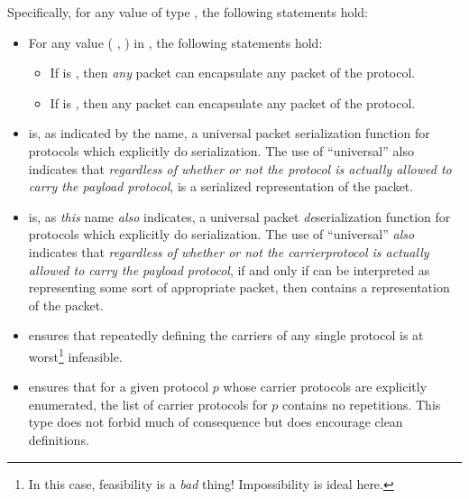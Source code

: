 \documentclass{report}
\begin{document}
Specifically, for any value  of type  , the following statements hold:
\begin{itemize}
	\item For any value \AgdaSymbol( \AgdaSymbol , \AgdaSymbol) in  , the following statements hold:
	\begin{itemize}
		\item If  is , then \emph{any} packet can encapsulate any packet of the  protocol.
		\item If  is  , then any  packet can encapsulate any packet of the  protocol.
	\end{itemize}
	\item {}  is, as indicated by the name, a universal packet serialization function for protocols which explicitly do serialization.  The use of ``universal'' also indicates that \emph{regardless of whether or not the  protocol is actually allowed to carry the payload protocol},  \AgdaUnderscore{}  \AgdaUnderscore{} \AgdaUnderscore{} \AgdaUnderscore{} is a serialized representation of the  packet.
	\item {}  is, as \emph{this} name \emph{also} indicates, a universal packet \emph{de}serialization function for protocols which explicitly do serialization.  The use of ``universal'' \emph{also} indicates that \emph{regardless of whether or not the carrierprotocol is actually allowed to carry the payload protocol}, if and only if  can be interpreted as representing some sort of appropriate packet, then  \AgdaUnderscore{}  contains a representation of the  packet.
	\item {}  ensures that repeatedly defining the carriers of any single protocol is at worst\footnote{In this case, feasibility is a \emph{bad} thing!  Impossibility is ideal here.} infeasible.
	\item {}  ensures that for a given protocol \(p\) whose carrier protocols are explicitly enumerated, the list of carrier protocols for \(p\) contains no repetitions.   This type does not forbid much of consequence but does encourage clean definitions.

\end{itemize}
\end{document}
